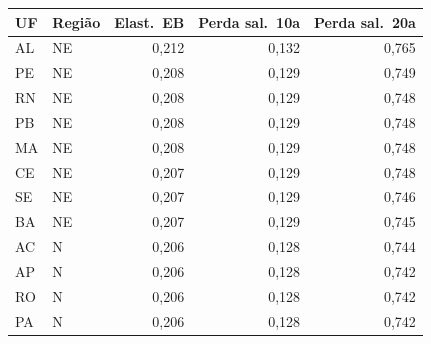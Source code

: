 \begin{tabular}{llrrr}
\toprule
UF & Região & Elast.\ EB & Perda sal.\ 10a & Perda sal.\ 20a \\
\midrule
AL & NE & 0,212 & 0,132 & 0,765 \\
PE & NE & 0,208 & 0,129 & 0,749 \\
RN & NE & 0,208 & 0,129 & 0,748 \\
PB & NE & 0,208 & 0,129 & 0,748 \\
MA & NE & 0,208 & 0,129 & 0,748 \\
CE & NE & 0,207 & 0,129 & 0,748 \\
SE & NE & 0,207 & 0,129 & 0,746 \\
BA & NE & 0,207 & 0,129 & 0,745 \\
AC & N & 0,206 & 0,128 & 0,744 \\
AP & N & 0,206 & 0,128 & 0,742 \\
RO & N & 0,206 & 0,128 & 0,742 \\
PA & N & 0,206 & 0,128 & 0,742 \\
\bottomrule
\end{tabular}

